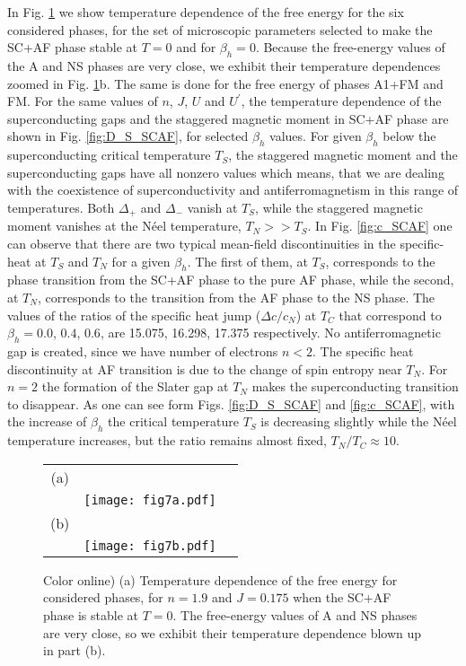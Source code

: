 \documentclass[aps,prb,showpacs,reprint]{revtex4-1}
\begin{document}
In Fig. \ref{fig:fe_SCAF} we show temperature dependence of the free energy
for the six considered phases, for the set of microscopic parameters selected
to
make the SC+AF phase stable at $T=0$ and for $\beta_h=0$. Because the
free-energy values of the A and NS phases are very
close, we exhibit their temperature dependences zoomed in Fig.
\ref{fig:fe_SCAF}b. The same is done for the free energy of phases A1+FM and
FM. For the
same values of $n$, $J$, $U$ and $U^{\prime}$, the temperature dependence of the
superconducting
gaps and the staggered magnetic moment in SC+AF phase are shown in Fig.
\ref{fig:D_S_SCAF}, for selected $\beta_h$ values. For given
$\beta_h$ below the superconducting critical temperature $T_S$, the staggered
magnetic
moment and the superconducting gaps have all nonzero values which means, that
we are dealing with the coexistence of superconductivity and antiferromagnetism
in this range of temperatures. Both $\Delta_+$ and
$\Delta_-$ vanish at $T_S$, while the staggered magnetic
moment vanishes at the N\'{e}el temperature, $T_N>>T_S$. In Fig.
\ref{fig:c_SCAF} one
can observe that
there are two typical mean-field discontinuities in the specific-heat at $T_S$
and $T_N$ for a given $\beta_h$. The first of them, at
$T_S$, corresponds to the phase transition from the SC+AF phase to the pure AF 
phase, while the second, at $T_N$, corresponds to the transition from the AF
phase to the
NS phase.  The values of the ratios of the specific heat jump
($\Delta c/c_N$) at $T_C$ that correspond to $\beta_h=0.0$, $0.4$, $0.6$, are
15.075, 16.298, 17.375 respectively. No
antiferromagnetic gap is created, since we have number of electrons $n<2$. The
specific heat discontinuity at AF transition is due to the change of spin
entropy near $T_N$. For $n=2$ the formation of the Slater gap at $T_N$ makes the
superconducting transition to disappear.  
As one can see form Figs. \ref{fig:D_S_SCAF} and \ref{fig:c_SCAF}, with the
increase
of $\beta_h$ the critical temperature $T_S$
is decreasing slightly while the N\'{e}el temperature increases, but the ratio
remains almost fixed, $T_N/T_C\approx 10$. 
\begin{figure}[htpb]
\centering
\begin{tabular}{ccc}
  (a) & & \quad \quad \quad \quad \quad\\
      & \texttt{[image: fig7a.pdf]} & \\
  (b) & & \quad \quad \quad \quad \quad\\
      & \texttt{[image: fig7b.pdf]} &\\
\end{tabular}
\caption{Color online) (a) Temperature dependence of the free energy for
considered phases, for $n=1.9$ and $J=0.175$ when the SC+AF phase is stable at
$T=0$.
The free-energy values of A and NS phases are very
close, so we exhibit their temperature dependence blown up in part (b).}
\label{fig:fe_SCAF}
\end{figure}
\end{document}
